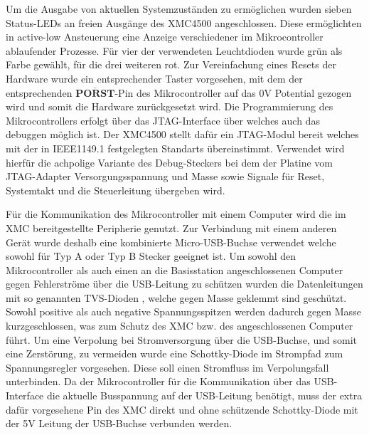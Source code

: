 
Um die Ausgabe von aktuellen Systemzuständen zu ermöglichen wurden sieben Status-LEDs an freien Ausgänge des XMC4500  angeschlossen. Diese ermöglichten in active-low Ansteuerung eine Anzeige verschiedener im Mikrocontroller ablaufender Prozesse. Für vier der verwendeten Leuchtdioden wurde grün als Farbe gewählt, für die drei weiteren rot. Zur Vereinfachung eines Resets der Hardware wurde ein entsprechender Taster vorgesehen, mit dem der entsprechenden  $\overline{\textbf{PORST}}$-Pin des Mikrocontroller auf das 0V Potential gezogen wird und somit die Hardware zurückgesetzt wird.
Die Programmierung des Mikrocontrollers erfolgt über das \ac{JTAG}-Interface über welches auch das debuggen möglich ist. Der XMC4500 stellt dafür ein \ac{JTAG}-Modul bereit welches mit der in IEEE1149.1 festgelegten Standarts übereinstimmt. Verwendet wird hierfür die achpolige Variante des Debug-Steckers bei dem der Platine vom \ac{JTAG}-Adapter Versorgungsspannung und Masse sowie Signale für Reset, Systemtakt und die Steuerleitung übergeben wird.  %


Für die Kommunikation des Mikrocontroller mit einem Computer wird die im XMC  bereitgestellte Peripherie genutzt. Zur Verbindung mit einem anderen Gerät wurde deshalb eine kombinierte Micro-USB-Buchse verwendet welche sowohl für Typ A oder Typ B Stecker geeignet ist.
Um sowohl den Mikrocontroller als auch einen an die Basisstation angeschlossenen Computer gegen Fehlerströme über die USB-Leitung zu schützen wurden die Datenleitungen mit so genannten \ac{TVS}-Dioden , welche gegen Masse geklemmt sind geschützt. Sowohl positive als auch negative Spannungsspitzen werden dadurch gegen Masse kurzgeschlossen, was zum Schutz des XMC bzw. des angeschlossenen Computer führt. Um eine Verpolung bei Stromversorgung über die USB-Buchse, und somit eine Zerstörung, zu vermeiden wurde eine Schottky-Diode im Strompfad zum Spannungsregler vorgesehen. Diese soll einen Stromfluss im Verpolungsfall unterbinden. Da der Mikrocontroller für die Kommunikation über das USB-Interface die aktuelle Busspannung auf der USB-Leitung benötigt, muss der extra dafür vorgesehene Pin des XMC direkt und ohne schützende Schottky-Diode mit der 5V Leitung der USB-Buchse verbunden werden.


